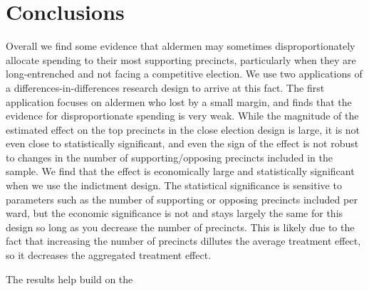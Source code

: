 \section*{Conclusions}

Overall we find some evidence that aldermen may sometimes disproportionately allocate spending to their most supporting precincts, particularly when they are long-entrenched and not facing a competitive election.
We use two applications of a differences-in-differences research design to arrive at this fact.
The first application focuses on aldermen who lost by a small margin, and finds that the evidence for disproportionate spending is very weak.
While the magnitude of the estimated effect on the top precincts in the close election design is large, it is not even close to statistically significant, and even the sign of the effect is not robust to changes in the number of supporting/opposing precincts included in the sample.
We find that the effect is economically large and statistically significant when we use the indictment design.
The statistical significance is sensitive to parameters such as the number of supporting or opposing precincts included per ward, but the economic significance is not and stays largely the same for this design so long as you decrease the number of precincts.
This is likely due to the fact that increasing the number of precincts dillutes the average treatment effect, so it decreases the aggregated treatment effect.

The results help build on the 
